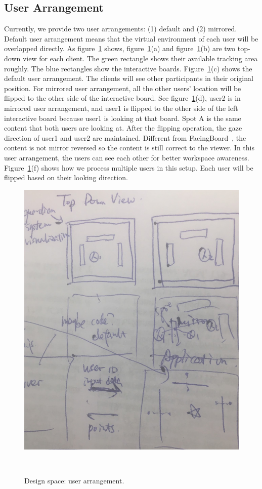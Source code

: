 \documentclass{sigchi}
\begin{document}
\subsection{User Arrangement}
Currently, we provide two user arrangements: (1) default and (2) mirrored. Default user arrangement means that the virtual environment of each user will be overlapped directly. As figure~\ref{fig:userarrangement} shows, figure~\ref{fig:userarrangement}(a) and figure~\ref{fig:userarrangement}(b) are two top-down view for each client. The green rectangle shows their available tracking area roughly. The blue rectangles show the interactive boards. Figure~\ref{fig:userarrangement}(c) shows the default user arrangement. The clients will see other participants in their original position. For mirrored user arrangement, all the other users' location will be flipped to the other side of the interactive board. See figure~\ref{fig:userarrangement}(d), user2 is in mirrored user arrangement, and user1 is flipped to the other side of the left interactive board because user1 is looking at that board. Spot A is the same content that both users are looking at. After the flipping operation, the gaze direction of user1 and user2 are maintained. Different from FacingBoard~\cite{li2014interactive}, the content is not mirror reversed so the content is still correct to the viewer. In this user arrangement, the users can see each other for better workspace awareness. Figure~\ref{fig:userarrangement}(f) shows how we process multiple users in this setup. Each user will be flipped based on their looking direction.

\begin{figure}[t!]
 \centering
 \includegraphics[width=0.9\columnwidth]{userarrangement.jpg}
 \caption{Design space: user arrangement.
 }~\label{fig:userarrangement}
\end{figure}
\end{document}
